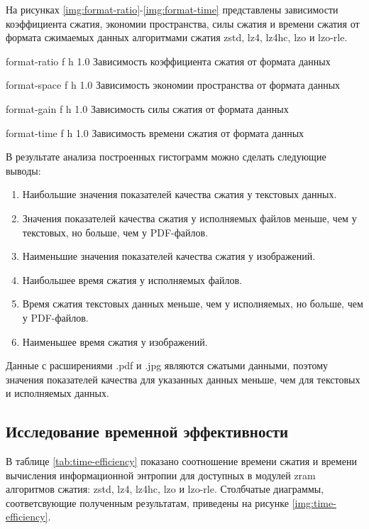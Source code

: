 На рисунках \ref{img:format-ratio}-\ref{img:format-time} представлены зависимости коэффициента сжатия, экономии пространства, силы сжатия и времени сжатия от формата сжимаемых данных алгоритмами сжатия zstd, lz4, lz4hc, lzo и lzo-rle.

    {format-ratio}
    {f}
    {h}
    {1.0\textwidth}
    {Зависимость коэффициента сжатия от формата данных}

    {format-space}
    {f}
    {h}
    {1.0\textwidth}
    {Зависимость экономии пространства от формата данных}

    {format-gain}
    {f}
    {h}
    {1.0\textwidth}
    {Зависимость силы сжатия от формата данных}

    {format-time}
    {f}
    {h}
    {1.0\textwidth}
    {Зависимость времени сжатия от формата данных}

В результате анализа построенных гистограмм можно сделать следующие выводы:

\begin{enumerate}
    \item Наибольшие значения показателей качества сжатия у текстовых данных.
    \item Значения показателей качества сжатия у исполняемых файлов меньше, чем у текстовых, но больше, чем у PDF-файлов.
    \item Наименьшие значения показателей качества сжатия у изображений.
    \item Наибольшее время сжатия у исполняемых файлов.
    \item Время сжатия текстовых данных меньше, чем у исполняемых, но больше, чем у PDF-файлов.
    \item Наименьшее время сжатия у изображений.
\end{enumerate}

Данные с расширениями .pdf и .jpg являются сжатыми данными, поэтому значения показателей качества для указанных данных меньше, чем для текстовых и исполняемых данных.

\subsection{Исследование временной эффективности}

В таблице \ref{tab:time-efficiency} показано соотношение времени сжатия и времени вычисления информационной энтропии для доступных в модулей zram алгоритмов сжатия: zstd, lz4, lz4hc, lzo и lzo-rle. Столбчатые диаграммы, соответсвующие полученным результатам, приведены на рисунке \ref{img:time-efficiency}.

